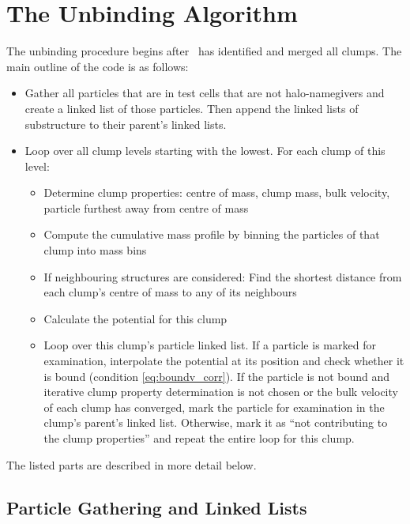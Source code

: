 \section{The Unbinding Algorithm}\label{chap:my_code}

The unbinding procedure begins after \phew\ has identified and merged all clumps.
The main outline of the code is as follows:
%
\begin{itemize}[noitemsep,topsep=-1em]
	\item 	Gather all particles that are in test cells that are not halo-namegivers and create a linked list of those particles. 
			Then append the linked lists of substructure to their parent's linked lists.
	\item Loop over all clump levels starting with the lowest.
			For each clump of this level:%
	\begin{itemize}[noitemsep,topsep=-1em]
		\item Determine clump properties: centre of mass, clump mass, bulk velocity, particle furthest away from centre of mass
		\item 	Compute the cumulative mass profile by binning the particles of that clump into mass bins
		\item 	If neighbouring structures are considered: Find the shortest distance from each clump's centre of mass to any of its neighbours
		\item 	Calculate the potential for this clump
		\item Loop over this clump's particle linked list. 
		If a particle is marked for examination, interpolate the potential at its position and check whether it is bound (condition \eqref{eq:boundv_corr}). 
		If the particle is not bound and iterative clump property determination is not chosen or the bulk velocity of each clump has converged, mark the particle for examination in the clump's parent's linked list. Otherwise, mark it as ``not contributing to the clump properties'' and repeat the entire loop for this clump.
	\end{itemize}
\end{itemize}

The listed parts are described in more detail below.














\subsection{Particle Gathering and Linked Lists}

